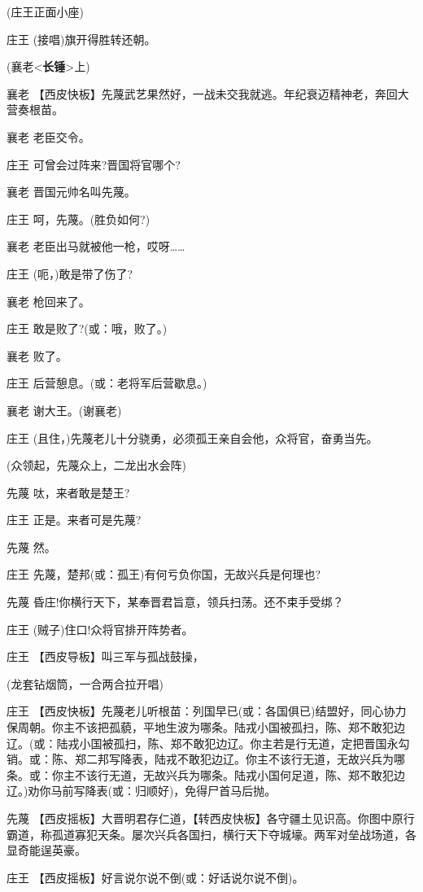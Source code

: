 (庄王正面小座)

庄王 (接唱)旗开得胜转还朝。

(襄老\textless{}\textbf{长锤}\textgreater{}上)

襄老
【西皮快板】先蔑武艺果然好，一战未交我就逃。年纪衰迈精神老，奔回大营奏根苗。

襄老 老臣交令。

庄王 可曾会过阵来?晋国将官哪个?

襄老 晋国元帅名叫先蔑。

庄王 呵，先蔑。(胜负如何?)

襄老 老臣出马就被他一枪，哎呀\ldots{}\ldots{}

庄王 (呃，)敢是带了伤了?

襄老 枪回来了。

庄王 敢是败了?(或：哦，败了。)

襄老 败了。

庄王 后营憩息。(或：老将军后营歇息。)

襄老 谢大王。(谢襄老)

庄王 (且住，)先蔑老儿十分骁勇，必须孤王亲自会他，众将官，奋勇当先。

(众领起，先蔑众上，二龙出水会阵)

先蔑 呔，来者敢是楚王?

庄王 正是。来者可是先蔑?

先蔑 然。

庄王 先蔑，楚邦(或：孤王)有何亏负你国，无故兴兵是何理也?

先蔑 昏庄!你横行天下，某奉晋君旨意，领兵扫荡。还不束手受绑？

庄王 (贼子)住口!众将官排开阵势者。

庄王 【西皮导板】叫三军与孤战鼓操，

(龙套钻烟筒，一合两合拉开唱)

庄王
【西皮快板】先蔑老儿听根苗：列国早已(或：各国俱已)结盟好，同心协力保周朝。你主不该把孤藐，平地生波为哪条。陆戎小国被孤扫，陈、郑不敢犯边辽。(或：陆戎小国被孤扫，陈、郑不敢犯边辽。你主若是行无道，定把晋国永勾销。或：陈、郑二邦写降表，陆戎不敢犯边辽。你主不该行无道，无故兴兵为哪条。或：你主不该行无道，无故兴兵为哪条。陆戎小国何足道，陈、郑不敢犯边辽。)劝你马前写降表(或：归顺好)，免得尸首马后抛。

先蔑
【西皮摇板】大晋明君存仁道，【转西皮快板】各守疆土见识高。你图中原行霸道，称孤道寡犯天条。屡次兴兵各国扫，横行天下夺城壕。两军对垒战场道，各显奇能逞英豪。

庄王 【西皮摇板】好言说尔说不倒(或：好话说尔说不倒)。

